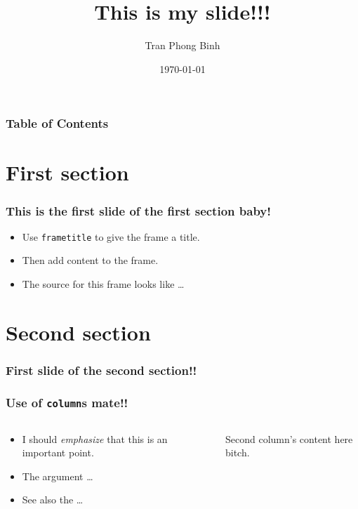 \documentclass{beamer}
\title{This is my slide!!!}
\author{Tran Phong Binh}
\institute{National Tsing Hua University}
\date{\today}
\begin{document}
\begin{frame}
    \titlepage
\end{frame}

\begin{frame}
    \frametitle{Table of Contents}
    \tableofcontents
\end{frame}

\section{First section}
\begin{frame}
    \frametitle{This is the first slide of the first section baby!}
    \begin{itemize}
        \item Use \texttt{frametitle} to give the frame a title.
        \item Then add content to the frame.
        \item The source for this frame looks like \ldots
    \end{itemize}
\end{frame}

\section{Second section}
\begin{frame}
    \frametitle{First slide of the second section!!}
    \tableofcontents[currentsection]
\end{frame}

\begin{frame}
    \frametitle{Use of \texttt{column}s mate!!}
    \begin{columns}
        \begin{column}{0.4\textwidth}
            \begin{itemize}
                \item I should \emph{emphasize} that this is an \alert{important} point.
                \item The argument \ldots
                \item See also the \ldots
            \end{itemize}
        \end{column}
        \begin{column}{0.6\textwidth} %
        Second column's content here bitch.
        \end{column}
    \end{columns}
\end{frame}
\end{document}
